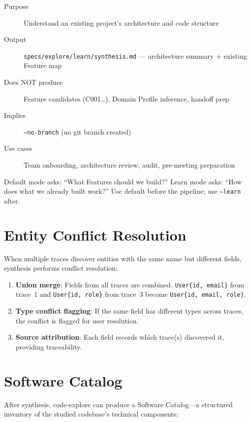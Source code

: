 \documentclass[11pt,a4paper,openright,twoside]{report}
\newcommand{\file}[1]{\texttt{#1}}
\begin{document}
\begin{description}
  \item[Purpose] Understand an existing project's architecture and code structure
  \item[Output] \file{specs/explore/learn/synthesis.md} --- architecture summary + existing Feature map
  \item[Does NOT produce] Feature candidates (C001\ldots), Domain Profile inference, handoff prep
  \item[Implies] \texttt{--no-branch} (no git branch created)
  \item[Use cases] Team onboarding, architecture review, audit, pre-meeting preparation
\end{description}

\begin{tipbox}
Default mode asks: ``What Features should we build?'' Learn mode asks: ``How does what we already built work?'' Use default before the pipeline; use \texttt{--learn} after.
\end{tipbox}

\section{Entity Conflict Resolution}

When multiple traces discover entities with the same name but different fields, synthesis performs conflict resolution:

\begin{enumerate}
  \item \textbf{Union merge}: Fields from all traces are combined. \texttt{User\{id, email\}} from trace~1 and \texttt{User\{id, role\}} from trace~3 become \texttt{User\{id, email, role\}}.
  \item \textbf{Type conflict flagging}: If the same field has different types across traces, the conflict is flagged for user resolution.
  \item \textbf{Source attribution}: Each field records which trace(s) discovered it, providing traceability.
\end{enumerate}

\section{Software Catalog}

After synthesis, code-explore can produce a Software Catalog---a structured inventory of the studied codebase's technical components:
\end{document}
